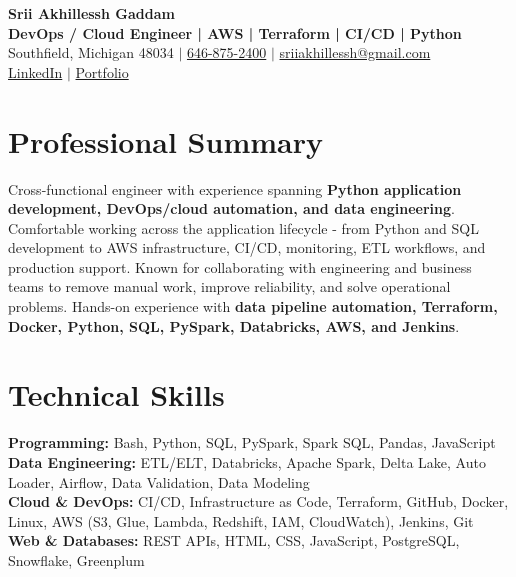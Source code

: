 \documentclass[letterpaper,10pt]{article}
\begin{document}
\fontsize{9.35pt}{10.45pt}\selectfont

\begin{center}
    {\LARGE \textbf{Srii Akhillessh Gaddam}} \\[-1pt]
    \textbf{DevOps / Cloud Engineer | AWS | Terraform | CI/CD | Python} \\[2pt]
    Southfield, Michigan 48034 $|$
    \href{tel:6468752400}{646-875-2400} $|$
    \href{mailto:sriiakhillessh@gmail.com}{sriiakhillessh@gmail.com} \\[1pt]
    \href{https://www.linkedin.com/in/srii-akhiilessh-gaddam-b48668191/}{LinkedIn} $|$
    \href{https://sriiakhillesshg.github.io/portfolio/}{Portfolio}
\end{center}
\vspace{-8pt}

\section{Professional Summary}
\small{Cross-functional engineer with experience spanning \textbf{Python application development, DevOps/cloud automation, and data engineering}. Comfortable working across the application lifecycle - from Python and SQL development to AWS infrastructure, CI/CD, monitoring, ETL workflows, and production support. Known for collaborating with engineering and business teams to remove manual work, improve reliability, and solve operational problems. Hands-on experience with \textbf{data pipeline automation, Terraform, Docker, Python, SQL, PySpark, Databricks, AWS, and Jenkins}.}

\section{Technical Skills}
\small{
\textbf{Programming:} Bash, Python, SQL, PySpark, Spark SQL, Pandas, JavaScript \\
\textbf{Data Engineering:} ETL/ELT, Databricks, Apache Spark, Delta Lake, Auto Loader, Airflow, Data Validation, Data Modeling \\
\textbf{Cloud \& DevOps:} CI/CD, Infrastructure as Code, Terraform, GitHub, Docker, Linux, AWS (S3, Glue, Lambda, Redshift, IAM, CloudWatch), Jenkins, Git \\
\textbf{Web \& Databases:} REST APIs, HTML, CSS, JavaScript, PostgreSQL, Snowflake, Greenplum
}
\end{document}
